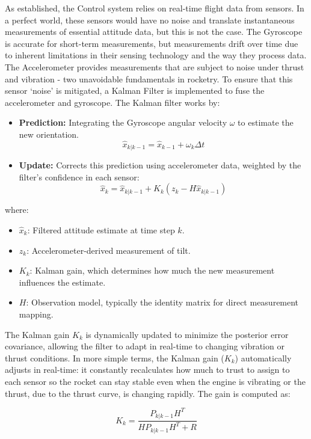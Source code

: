 As established, the Control system relies on real-time flight data from sensors. In a perfect world, these sensors would have no noise and translate instantaneous measurements of essential attitude data, but this is not the case. The Gyroscope is accurate for short-term measurements, but measurements drift over time due to inherent limitations in their sensing technology and the way they process data. The Accelerometer provides measurements that are subject to noise under thrust and vibration - two unavoidable fundamentals in rocketry.
To ensure that this sensor ‘noise’ is mitigated, a Kalman Filter is implemented to fuse the accelerometer and gyroscope. The Kalman filter works by:

\begin{itemize}
    \item \textbf{Prediction:} Integrating the Gyroscope angular velocity $\omega$ to estimate the new orientation.
    \[
    \hat{x}_{k|k-1} = \hat{x}_{k-1} + \omega_k \Delta t
    \]
    \item \textbf{Update:} Corrects this prediction using accelerometer data, weighted by the filter’s confidence in each sensor:
    \[
    \hat{x}_k = \hat{x}_{k|k-1} + K_k (z_k - H \hat{x}_{k|k-1})
    \]
\end{itemize}

where:

\begin{itemize}
    \item $\hat{x}_k$: Filtered attitude estimate at time step $k$.
    \item $z_k$: Accelerometer-derived measurement of tilt.
    \item $K_k$: Kalman gain, which determines how much the new measurement influences the estimate.
    \item $H$: Observation model, typically the identity matrix for direct measurement mapping.
\end{itemize}

The Kalman gain $K_k$ is dynamically updated to minimize the posterior error covariance, allowing the filter to adapt in real-time to changing vibration or thrust conditions. In more simple terms, the Kalman gain ($K_k$) automatically adjusts in real-time: it constantly recalculates how much to trust to assign to each sensor so the rocket can stay stable even when the engine is vibrating or the thrust, due to the thrust curve, is changing rapidly. The gain is computed as:

\[
K_k = \frac{P_{k|k-1} H^T}{H P_{k|k-1} H^T + R}
\]

